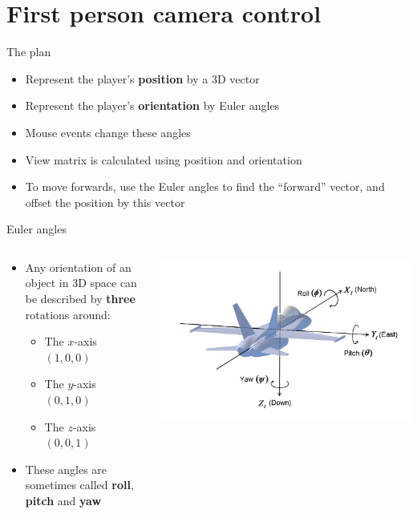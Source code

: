 \part{First person camera control}
\frame{\partpage}

\begin{frame}{The plan}
	\begin{itemize}
		\pause\item Represent the player's \textbf{position} by a 3D vector
		\pause\item Represent the player's \textbf{orientation} by Euler angles
		\pause\item Mouse events change these angles
		\pause\item View matrix is calculated using position and orientation
		\pause\item To move forwards, use the Euler angles to find the ``forward'' vector,
			and offset the position by this vector
	\end{itemize}
\end{frame}

\begin{frame}{Euler angles}
	\begin{columns}
		\begin{column}{0.48\textwidth}
			\begin{itemize}
				\pause\item Any orientation of an object in 3D space can be described by \textbf{three} rotations around:
					\begin{itemize}
						\pause\item The $x$-axis $(1, 0, 0)$
						\pause\item The $y$-axis $(0, 1, 0)$
						\pause\item The $z$-axis $(0, 0, 1)$
					\end{itemize}
				\pause\item These angles are sometimes called \textbf{roll}, \textbf{pitch} and \textbf{yaw}
			\end{itemize}
		\end{column}
		\begin{column}{0.48\textwidth}
			\includegraphics[width=\textwidth]{euler_aeroplane}
		\end{column}
	\end{columns}
\end{frame}

